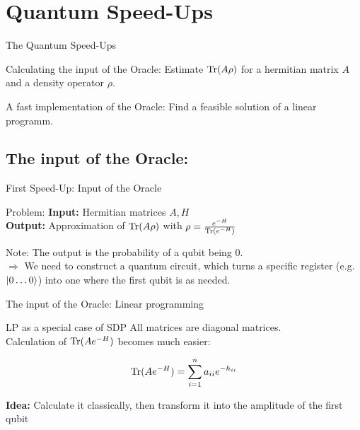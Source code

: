 \section{Quantum Speed-Ups}


\begin{frame}{The Quantum Speed-Ups}
 \begin{block}{Calculating the input of the Oracle:}
  Estimate $\operatorname{Tr}(A\rho)$ for a hermitian matrix $A$ and a density operator $\rho$.
 \end{block}
 
 \begin{block}{A fast implementation of the Oracle:}
  Find a feasible solution of a linear programm.
 \end{block}
\end{frame}

\subsection{The input of the Oracle:}

\begin{frame}{First Speed-Up: Input of the Oracle}
 \begin{block}{Problem:}
  \textbf{Input:} Hermitian matrices $A,H$ \\
  \textbf{Output:} Approximation of $\operatorname{Tr}(A\rho)$ with $\rho=\frac{e^{-H}}{\operatorname{Tr}(e^{-H})}$
 \end{block}
 
 \begin{block}{Note:}
  The output is the probability of a qubit being $0$.\\
  \alert{$\Rightarrow$ We need to construct a quantum circuit, which turns a specific register (e.g. $\ket{0\ldots 0}$) into one where the first qubit is as needed.}
 \end{block} 
\end{frame}

\begin{frame}{The input of the Oracle: Linear programming}
\begin{block}{LP as a special case of SDP}
All matrices are diagonal matrices.\\
\alert{Calculation of $\operatorname{Tr}(Ae^{-H})$ becomes much easier:}

\begin{equation*}
\operatorname{Tr}(Ae^{-H})=\sum_{i=1}^n a_{ii}e^{-h_{ii}}
\end{equation*}

\end{block}

\vspace{1cm}

\textbf{Idea:} Calculate it classically, then transform it into the amplitude of the first qubit

\end{frame}

